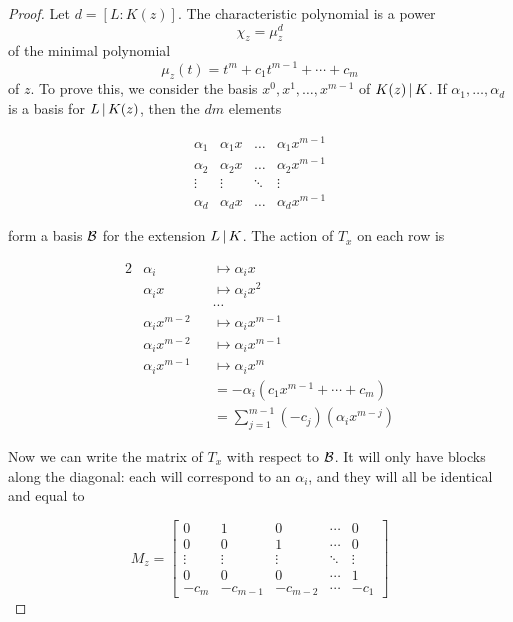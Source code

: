 \begin{proof}
  Let $d=[L:K(z)]$. The characteristic polynomial is a power \[\chi_z = \mu_z^d
  \] of the minimal polynomial \[ \mu_z(t) = t^m + c_1 t^{m-1} + \cdots + c_m
  \] of $z$. To prove this, we consider the basis $x^0, x^1, \ldots, x^{m-1}$ of
  $K(z) \mathop{|} K$. If $\alpha_1, \ldots, \alpha_d$ is a basis for
  $L \mathop{|} K(z)$, then the $dm$ elements 

  \[
    \begin{array}{cccc}
      \alpha_1 &\alpha_1 x &\ldots &\alpha_1 {x^{m-1}} \\
      \alpha_2 &\alpha_2 x &\ldots &\alpha_2 {x^{m-1}} \\
      \vdots   &\vdots     &\ddots &\vdots \\
      \alpha_d &\alpha_d x &\ldots &\alpha_d {x^{m-1}} 
    \end{array}
  \]

  form a basis $\mathcal{B}$ for the extension $L \mathop{|} K$. The action of $T_x$ on each row
  is 

  \begin{alignat*}{2}
    &\alpha_i         &&\mapsto \alpha_i x \\
    &\alpha_i x       &&\mapsto \alpha_i x^2 \\
    &{}               &&\cdots\\
    &\alpha_i x^{m-2} &&\mapsto \alpha_i x^{m-1} \\
    &\alpha_i x^{m-2} &&\mapsto \alpha_i x^{m-1} \\
    &\alpha_i x^{m-1} &&\mapsto \alpha_i x^m \\
    &{}               &&= -\alpha_i (c_1 x^{m-1} + \cdots + c_m) \\
    &{}               &&= \sum_{j=1}^{m-1} (-c_j) (\alpha_i x^{m-j})
  \end{alignat*}

  Now we can write the matrix of $T_x$ with respect to $\mathcal{B}$. It will only have
  blocks along the diagonal: each will correspond to an $\alpha_i$, and they
  will all be identical and equal to

  \[ M_z =
  \begin{bmatrix}
    0      & 1        & 0        & \cdots & 0 \\
    0      & 0        & 1        & \cdots & 0 \\
    \vdots & \vdots   & \vdots   & \ddots & \vdots \\
    0      & 0        & 0        & \cdots & 1 \\
    -c_m   & -c_{m-1} & -c_{m-2} & \cdots & -c_1
  \end{bmatrix}
  \]


\end{proof}
